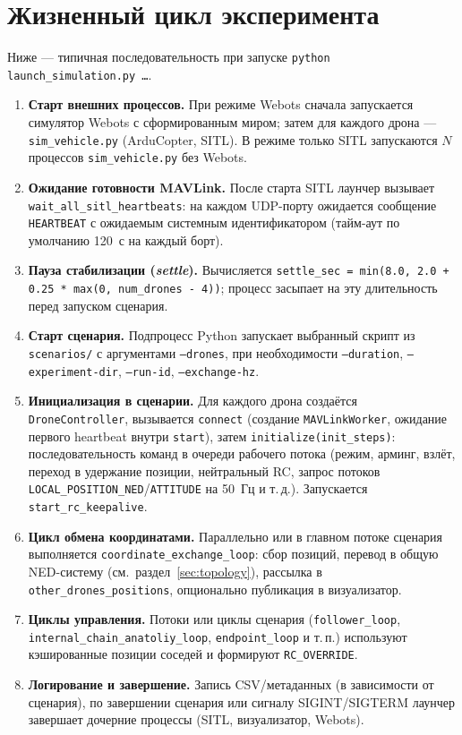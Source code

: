 \documentclass[12pt,a4paper]{article}
\begin{document}
\section{Жизненный цикл эксперимента}

Ниже --- типичная последовательность при запуске \texttt{python launch\_simulation.py \ldots}.

\begin{enumerate}
  \item \textbf{Старт внешних процессов.} При режиме Webots сначала запускается симулятор Webots с сформированным миром; затем для каждого дрона --- \texttt{sim\_vehicle.py} (ArduCopter, SITL). В режиме только SITL запускаются $N$ процессов \texttt{sim\_vehicle.py} без Webots.
  \item \textbf{Ожидание готовности MAVLink.} После старта SITL лаунчер вызывает \texttt{wait\_all\_sitl\_heartbeats}: на каждом UDP-порту ожидается сообщение \texttt{HEARTBEAT} с ожидаемым системным идентификатором (тайм-аут по умолчанию 120~с на каждый борт).
  \item \textbf{Пауза стабилизации (\emph{settle}).} Вычисляется \texttt{settle\_sec = min(8.0, 2.0 + 0.25 * max(0, num\_drones - 4))}; процесс засыпает на эту длительность перед запуском сценария.
  \item \textbf{Старт сценария.} Подпроцесс Python запускает выбранный скрипт из \texttt{scenarios/} с аргументами \texttt{--drones}, при необходимости \texttt{--duration}, \texttt{--experiment-dir}, \texttt{--run-id}, \texttt{--exchange-hz}.
  \item \textbf{Инициализация в сценарии.} Для каждого дрона создаётся \texttt{DroneController}, вызывается \texttt{connect} (создание \texttt{MAVLinkWorker}, ожидание первого heartbeat внутри \texttt{start}), затем \texttt{initialize(init\_steps)}: последовательность команд в очереди рабочего потока (режим, арминг, взлёт, переход в удержание позиции, нейтральный RC, запрос потоков \texttt{LOCAL\_POSITION\_NED}/\texttt{ATTITUDE} на 50~Гц и т.\,д.). Запускается \texttt{start\_rc\_keepalive}.
  \item \textbf{Цикл обмена координатами.} Параллельно или в главном потоке сценария выполняется \texttt{coordinate\_exchange\_loop}: сбор позиций, перевод в общую NED-систему (см.\ раздел~\ref{sec:topology}), рассылка в \texttt{other\_drones\_positions}, опционально публикация в визуализатор.
  \item \textbf{Циклы управления.} Потоки или циклы сценария (\texttt{follower\_loop}, \texttt{internal\_chain\_anatoliy\_loop}, \texttt{endpoint\_loop} и т.\,п.) используют кэшированные позиции соседей и формируют \texttt{RC\_OVERRIDE}.
  \item \textbf{Логирование и завершение.} Запись CSV/метаданных (в зависимости от сценария), по завершении сценария или сигналу SIGINT/SIGTERM лаунчер завершает дочерние процессы (SITL, визуализатор, Webots).
\end{enumerate}
\end{document}
